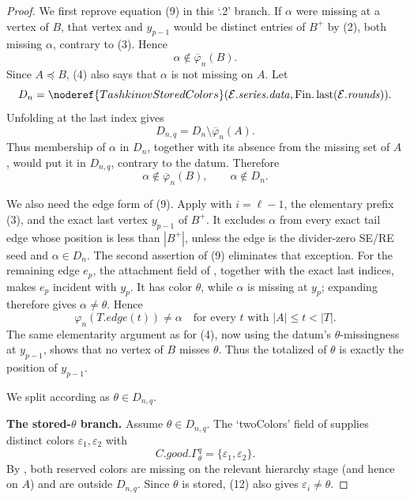 \begin{proof}
We first reprove equation (9) in this `.2' branch.  If \(\alpha\) were
missing at a vertex of \(B\), that vertex and \(y_{p-1}\) would be
distinct entries of \(B^+\) by (2), both missing \(\alpha\), contrary
to (3).  Hence
\[
                    \alpha\notin\overline\varphi_n(B).       \tag{4}
\]
Since \(A\preccurlyeq B\), (4) also says that \(\alpha\) is not
missing on \(A\).  Let
\[
 D_n=\noderef{TashkinovStoredColors}
   (\mathcal E.\mathit{series}.\mathit{data},
      \operatorname{Fin.last}(\mathcal E.\mathit{rounds})).
\]
Unfolding  at the last index gives
\[
                 D_{n,q}=D_n\setminus\overline\varphi_n(A).
\]
Thus membership of \(\alpha\) in \(D_n\), together with its absence
from the missing set of \(A\), would put it in \(D_{n,q}\), contrary
to the datum.  Therefore
\[
              \alpha\notin\overline\varphi_n(B),\qquad
              \alpha\notin D_n.                              \tag{9}
\]

We also need the edge form of (9).  Apply
 with \(i=\ell-1\),
the elementary prefix (3), and the exact last vertex
\(y_{p-1}\) of \(B^+\).  It excludes \(\alpha\) from every exact
tail edge whose position is less than \(|B^+|\), unless the edge is the
divider-zero SE/RE seed and \(\alpha\in D_n\).  The second assertion
of (9) eliminates that exception.  For the remaining edge \(e_p\), the
attachment field of , together with the exact
last indices, makes \(e_p\) incident with \(y_p\).  It has color
\(\theta\), while \(\alpha\) is missing at \(y_p\); expanding
 therefore gives \(\alpha\ne\theta\).  Hence
\[
 \varphi_n(T.\mathit{edge}(t))\ne\alpha
       \quad\text{for every }t\text{ with }|A|\leq t<|T|.    \tag{10}
\]
The same elementarity argument as for (4), now using the datum's
\(\theta\)-missingness at \(y_{p-1}\), shows that no vertex of \(B\)
misses \(\theta\).  Thus the totalized
 of \(\theta\) is exactly the
position of \(y_{p-1}\).                                      \(\tag{11}\)

We split according as \(\theta\in D_{n,q}\).

\textbf{The stored-\(\theta\) branch.}
Assume \(\theta\in D_{n,q}\).  The `twoColors' field of
 supplies distinct colors
\(\varepsilon_1,\varepsilon_2\) with
\[
 C.\mathit{good}.\Gamma^q_\theta
       =\{\varepsilon_1,\varepsilon_2\}.                    \tag{12}
\]
By , both reserved colors are
missing on the relevant hierarchy stage (and hence on \(A\)) and are
outside \(D_{n,q}\).  Since \(\theta\) is stored, (12) also gives
\(\varepsilon_i\ne\theta\).


\end{proof}
